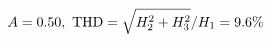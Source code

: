 \documentclass[preview]{standalone}
\begin{document}
\begin{align*}
\special{dvisvgm:raw <g id='unique000'>}A=0.50,\ \text{THD}=\sqrt{H_2^2+H_3^2}/H_1=9.6\%\special{dvisvgm:raw </g>}
\end{align*}
\end{document}
